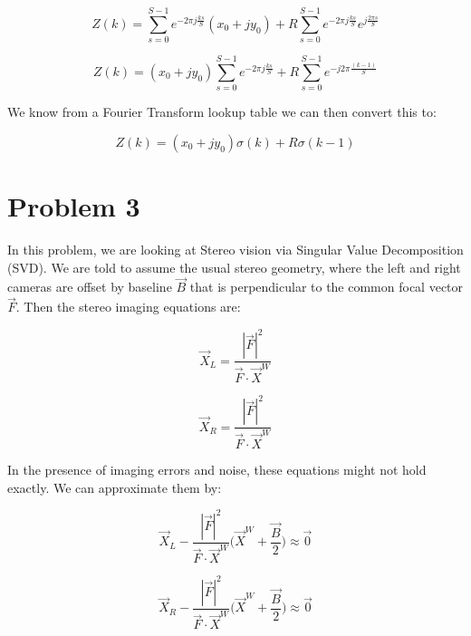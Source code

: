 \documentclass{article}
\begin{document}
\begin{equation}
    Z(k) = \sum^{S-1}_{s=0} e^{-2\pi j \frac{ks}{S}} (x_0 + jy_0) + R\sum^{S-1}_{s=0} e^{-2\pi j \frac{ks}{S}} e^{j\frac{2\pi s}{S}}
\end{equation}

\begin{equation}
    Z(k) = (x_0 + jy_0) \sum^{S-1}_{s=0} e^{-2\pi j \frac{ks}{S}}  + R\sum^{S-1}_{s=0} e^{-j 2 \pi \frac{(k-1)}{S}}
\end{equation}

\noindent We know from a Fourier Transform lookup table we can then convert this to:

\begin{equation}
    Z(k) = (x_0+jy_0)\sigma(k) + R\sigma(k-1)
\end{equation}



\section*{Problem 3}

In this problem, we are looking at Stereo vision via Singular Value Decomposition (SVD). We are told to assume the usual stereo geometry, where the left and right cameras are offset by baseline $\vec{B}$ that is perpendicular to the common focal vector $\vec{F}$. Then the stereo imaging equations are:

\begin{equation}
    \vec{X}_L = \frac{|\vec{F}|^2}{\vec{F}\cdot \vec{X}^W}
\end{equation}

\begin{equation}
    \vec{X}_R = \frac{|\vec{F}|^2}{\vec{F}\cdot \vec{X}^W}
\end{equation}

\noindent In the presence of imaging errors and noise, these equations might not hold exactly. We can approximate them by:

\begin{equation}
    \vec{X}_L-\frac{|\vec{F}|^2}{\vec{F} \cdot \vec{X}^W}
    \bigl(
        \vec{X}^W + \frac{\vec{B}}{2}
    \bigr) \approx \vec{0}
\end{equation}

\begin{equation}
    \vec{X}_R-\frac{|\vec{F}|^2}{\vec{F} \cdot \vec{X}^W}
    \bigl(
        \vec{X}^W + \frac{\vec{B}}{2}
    \bigr) \approx \vec{0}
\end{equation}
\end{document}
